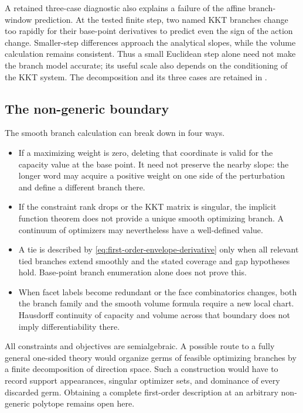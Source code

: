 A retained three-case diagnostic also explains a failure of the affine
branch-window prediction. At the tested finite step, two named KKT branches
change too rapidly for their base-point derivatives to predict even the sign
of the action change. Smaller-step differences approach the analytical
slopes, while the volume calculation remains consistent. Thus a small
Euclidean step alone need not make the branch model accurate; its useful
scale also depends on the conditioning of the KKT system. The decomposition and
its three cases are retained in
.

\subsection{The non-generic boundary}
\label{subsec:first-order-nongeneric-boundary}

The smooth branch calculation can break down in four ways.

\begin{itemize}
\item If a maximizing weight is zero, deleting that coordinate is valid for
  the capacity value at the base point.  It need not preserve the nearby
  slope: the longer word may acquire a positive weight on one side of the
  perturbation and define a different branch there.
\item If the constraint rank drops or the KKT matrix is singular, the implicit
  function theorem does not provide a unique smooth optimizing branch.  A
  continuum of optimizers may nevertheless have a well-defined value.
\item A tie is described by \eqref{eq:first-order-envelope-derivative} only
  when all relevant tied branches extend smoothly and the stated coverage
  and gap hypotheses hold.  Base-point branch enumeration alone does not prove
  this.
\item When facet labels become redundant or the face combinatorics changes,
  both the branch family and the smooth volume formula require a new local
  chart.  Hausdorff continuity of capacity and volume across that boundary
  does not imply differentiability there.
\end{itemize}

All constraints and objectives are semialgebraic.  A possible route to a fully
general one-sided theory would organize germs of feasible optimizing branches
by a finite decomposition of direction space.  Such a construction
would have to record support appearances, singular optimizer sets, and
dominance of every discarded germ. Obtaining a complete first-order
description at an arbitrary non-generic polytope remains open here.

